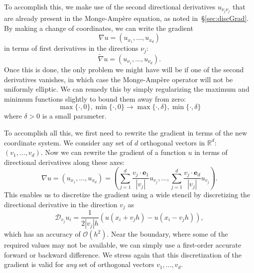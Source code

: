 \documentclass{amsart}
\theoremstyle{lemma}
\theoremstyle{remark}
\begin{document}
To accomplish this, we make use of the second directional derivatives $u_{\nu_j\nu_j}$ that are already present in the {{Monge-Amp\`ere}\xspace} equation, as noted in~\S\ref{sec:discGrad}.  By making a change of coordinates, we can write the gradient
\[ \nabla u =  \left(u_{x_1},\ldots,u_{x_d}\right)\]
in terms of first derivatives in the directions $\nu_j$:
\[ \tilde\nabla u = \left(u_{\nu_1},\ldots,u_{\nu_d}\right). \]
Once this is done, the only problem we might have will be if one of the second derivatives vanishes, in which case the {{Monge-Amp\`ere}\xspace} operator will not be uniformly elliptic.  We can remedy this by simply regularizing the maximum and minimum functions slightly to bound them away from zero:
\[ \max\{\cdot,0\},\min\{\cdot,0\} \to  \max\{\cdot,\delta\},\min\{\cdot,\delta\}\]
where $\delta>0$ is a small parameter.  

To accomplish all this, we first need to rewrite the gradient in terms of the new coordinate system.  We consider any set of $d$ orthogonal vectors in ${\mathbb{R}}^d$: $(v_1,\ldots,v_d)$.  Now we can rewrite the gradient of a function $u$ in terms of directional derivatives along these axes:
\[ \nabla u = \left(u_{x_1},\ldots,u_{x_d}\right) = \left(\sum\limits_{j=1}^d\frac{v_j\cdot {\mathbf{e}}_1}{{\left\vert{v_j}\right\vert}}u_{v_j},\ldots,\sum\limits_{j=1}^d\frac{v_j\cdot {\mathbf{e}}_d}{{\left\vert{v_j}\right\vert}}u_{v_j}\right). \]
This enables us to discretize the gradient using a wide stencil by discretizing the directional derivative in the direction $v_j$ as
\begin{equation}\label{eq:discGrad}
{\mathcal{D}}_{v_j}u_i = \frac{1}{2{\left\vert{v_j}\right\vert}h}\left(u(x_i + v_j h) -u(x_i - v_j h)\right), 
\end{equation}
which has an accuracy of ${\mathcal{O}}(h^2)$.  Near the boundary, where some of the required values may not be available, we can simply use a first-order accurate forward or backward difference.  We stress again that this discretization of the gradient is valid for \emph{any} set of orthogonal vectors $v_1,\ldots,v_d$.
\end{document}
